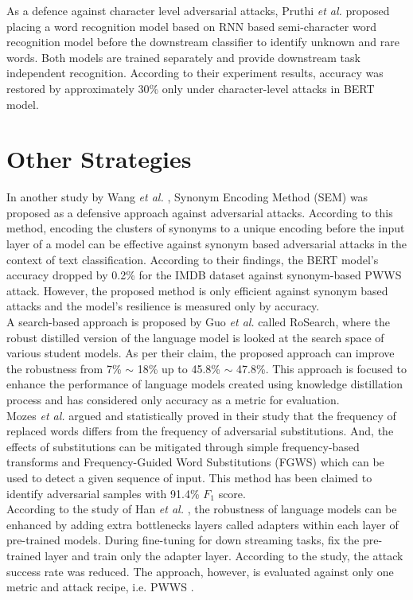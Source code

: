 \documentclass[%
	BCOR=8mm, %
	DIV=12,
	toc=bibliography, %
	toc=listof, %
	oneside, %
	egregdoesnotlikesansseriftitles, %
	]{scrbook}
\begin{document}
As a defence against character level adversarial attacks, Pruthi \textit{et al.} \cite{pruthi_combating_2019} proposed placing a word recognition model based on RNN based semi-character word recognition model before the downstream classifier to identify unknown and rare words. Both models are trained separately and provide downstream task independent recognition. According to their experiment results, accuracy was restored by approximately 30\% only under character-level attacks in BERT model. 
\section{Other Strategies}
In another study by Wang \textit{et al.} \cite{wang_natural_2020-1}, Synonym Encoding Method (SEM) was proposed as a defensive approach against adversarial attacks. According to this method,  encoding the clusters of synonyms to a unique encoding before the input layer of a model can be effective against synonym based adversarial attacks in the context of text classification. According to their findings, the BERT model's accuracy dropped by 0.2\% for the IMDB dataset against synonym-based PWWS \cite{ren_generating_2019} attack. However, the proposed method is only efficient against synonym based attacks and the model's resilience is measured only by accuracy.\\
A search-based approach is proposed by Guo \textit{et al.} \cite{guo_rosearch_2021} called RoSearch, where the robust distilled version of the language model is looked at the search space of various student models. As per their claim, the proposed approach can improve the robustness from 7\% $\sim$ 18\% up to 45.8\% $\sim$ 47.8\%. This approach is focused to enhance the performance of language models created using knowledge distillation process and has considered only accuracy as a metric for evaluation.\\
Mozes \textit{et al.} \cite{mozes_frequency-guided_2021} argued and statistically proved in their study that the frequency of replaced words differs from the frequency of adversarial substitutions. And, the effects of substitutions can be mitigated through simple frequency-based transforms and Frequency-Guided Word Substitutions (FGWS) which can be used to detect a given sequence of input. This method has been claimed to identify adversarial samples with 91.4\% $F_{1}$ score.\\
According to the study of Han \textit{et al.} \cite{han_robust_2021}, the robustness of language models can be enhanced by adding extra bottlenecks layers called adapters within each layer of pre-trained models. During fine-tuning for down streaming tasks, fix the pre-trained layer and train only the adapter layer. According to the study, the attack success rate was reduced. The approach, however, is evaluated against only one metric and attack recipe, i.e. PWWS \cite{ren_generating_2019}.\\
\end{document}
